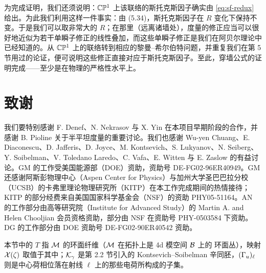为完成证明，我们还须说明：$\mathbb{C}\mathbb{P}^1$ 上该联络的斯托克斯因子确实由 \eqref{eq:sf-redux} 给出。为此我们利用这样一件事实：由 (5.34)，斯托克斯因子在 $R$ 变化下保持不变。于是我们可以取非常大的 $R$；在那里（远离诸墙处），度量的修正应当可以很好地近似为若干单瞬子修正的线性叠加，而这些单瞬子修正是我们在阿贝尔理论中已经知道的。从 $\mathbb{C}\mathbb{P}^1$ 上的联络转到相应的黎曼--希尔伯特问题，并重复我们在第 5 节用过的论证，便可说明这些修正直接对应于斯托克斯因子。至此，穿墙公式的证明完成——至少是在物理的严格性水平上。%

\section*{致谢}

我们要特别感谢 F. Denef、N. Nekrasov 与 X. Yin 在本项目早期阶段的合作，并感谢 B. Pioline 关于半平坦度量的重要讨论。我们也感谢 Wu-yen Chuang、E. Diaconescu、D. Jafferis、D. Joyce、M. Kontsevich、S. Lukyanov、N. Seiberg、Y. Soibelman、V. Toledano Laredo、C. Vafa、E. Witten 与 E. Zaslow 的有益讨论。GM 的工作受美国能源部（DOE）资助，资助号 DE-FG02-96ER40949。GM 还感谢阿斯彭物理中心（Aspen Center for Physics）与加州大学圣巴巴拉分校（UCSB）的卡弗里理论物理研究所（KITP）在本工作完成期间的热情接待；KITP 的部分经费来自美国国家科学基金会（NSF）的资助 PHY05-51164。AN 的工作部分由高等研究院（Institute for Advanced Study）的 Martin A. and Helen Chooljian 会员资格资助，部分由 NSF 在资助号 PHY-0503584 下资助。DG 的工作部分由 DOE 资助号 DE-FG02-90ER40542 资助。

\begin{yizhu}
本节中的 $T$ 指 $\mathcal{M}$ 的环面纤维（$\mathcal{M}$ 在拓扑上是 4d 模空间 $\mathcal{B}$ 上的 \SW 环面丛），映射 $\mathcal{X}(\zeta)$ 取值于其中；$\mathcal{K}_\gamma$ 是第 2.2 节引入的 Kontsevich--Soibelman 辛同胚，$(\Gamma_u)_\ell$ 则是中心荷相位落在射线 $\ell$ 上的那些电荷所构成的子集。%
\end{yizhu}
